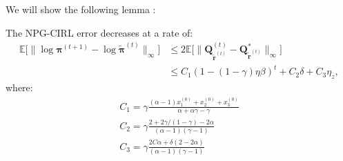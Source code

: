 We will show the following lemma : 
\begin{lemma}
    The NPG-CIRL error decreases at a rate of:
    \begin{equation}
        \begin{aligned}
            \mathbb{E} \Big[ 
                \| \log \bm{\pi}^{(t+1)} - \log \tilde{\bm{\pi}}^{(t)} \|_\infty 
            \Big]
            &\leq
            2 
            \mathbb{E} \Big[ 
                \|\bm{Q}^{(t)}_{\tilde{\bm{r}}^{(t)}}- \bm{Q}^*_{\tilde{\bm{r}}^{(t)}} \|_\infty 
            \Big] \\
            &\leq
            C_1 (1-(1-\gamma)\eta \beta)^t + C_2 \delta + C_3 \eta_z,
        \end{aligned}
    \end{equation}
    where:
    \begin{align*}
        C_1 = 
        \gamma \frac{(\alpha - 1)x_1^{(0)}+x_2^{(0)}+x_3^{(0)} }{\alpha + \alpha\gamma - \gamma}\\
        C_2 = \gamma\frac{2+2\gamma/(1-\gamma) - 2 \alpha }{(\alpha-1)(\gamma-1)}\\
        C_3 = \gamma\frac{2C\alpha+\delta (2-2\alpha)}{(\alpha-1)(\gamma-1)}
    \end{align*}\end{lemma}
